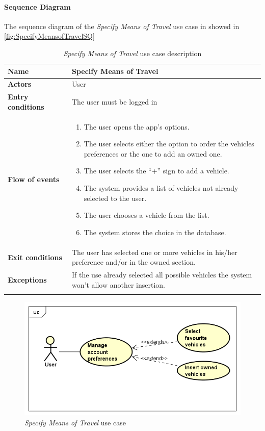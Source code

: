 \paragraph*{Sequence Diagram\\}
The sequence diagram of the \emph{Specify Means of Travel} use case in showed in \autoref{fig:SpecifyMeansofTravelSQ}
\newpage
\begin{longtable}{p{0.25\linewidth}|p{0.75\linewidth}}
	\hline
		\label{tab:SpecifyMeansofTravelTAB}
	\textbf{Name} & \textbf{Specify Means of Travel} \\
	\hline
	\textbf{Actors} & User \\
	\hline
	\textbf{Entry conditions} & The user must be logged in\\
	\hline
	\textbf{Flow of events} & 
	\begin{enumerate}
		\item The user opens the app's options.
		\item The user selects either the option to order the vehicles preferences or the one to add an owned one.
		\item The user selects the “+” sign to add a vehicle.
		\item The system provides a list of vehicles not already selected to the user.
		\item The user chooses a vehicle from the list.
		\item The system stores the choice in the database.
	\end{enumerate}\\
	\hline
	\textbf{Exit conditions} & The user has selected one or more vehicles in his/her preference and/or in the owned section.\\
	\hline
	\textbf{Exceptions} & If the use already selected all possible vehicles the system won’t allow another insertion. \\
	\hline
	\caption{\emph{Specify Means of Travel} use case description}
\end{longtable}

\begin{figure}[h]
	\includegraphics[width=\textwidth]{Img/SpecifyMeansofTravelUC}
	\caption{\emph{Specify Means of Travel} use case}
	\label{fig:SpecifyMeansofTravelUC}
\end{figure}

